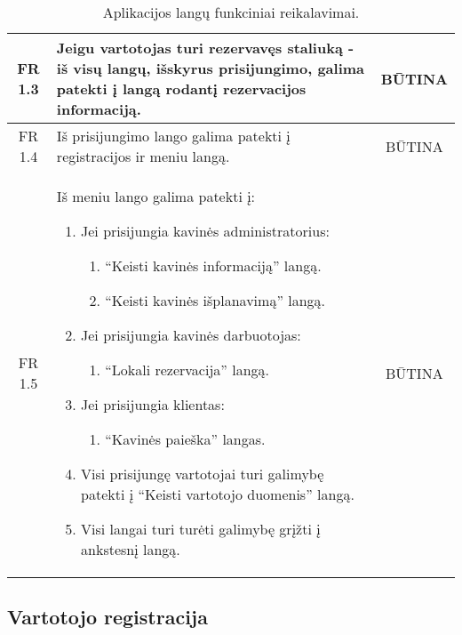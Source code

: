 \documentclass{VUMIFPSkursinis}
\begin{document}
\begin{center}
\begin{table}[H]
\begin{tabular}{|p{2cm}|p{}|p{}|}
		\multicolumn{1}{|c|}{FR 1.3}&
		{Jeigu vartotojas turi rezervavęs staliuką - iš visų langų, išskyrus \newline prisijungimo, galima patekti į langą rodantį rezervacijos informaciją.}&
		\multicolumn{1}{|c|}{BŪTINA}\\
	\hline
		\multicolumn{1}{|c|}{FR 1.4}&
		{Iš prisijungimo lango galima patekti į registracijos ir meniu langą.}&
		\multicolumn{1}{|c|}{BŪTINA}\\
	\hline
		\multicolumn{1}{|c|}{FR 1.5}&
		{Iš meniu lango galima patekti į:\newline
		\begin{enumerate}
			\item Jei prisijungia kavinės administratorius:
				\begin{enumerate}
					\item “Keisti kavinės informaciją” langą.
					\item “Keisti kavinės išplanavimą” langą.
				\end{enumerate}
			\item Jei prisijungia kavinės darbuotojas:
				\begin{enumerate}
					\item “Lokali rezervacija” langą.
				\end{enumerate}
			\item Jei prisijungia klientas:
				\begin{enumerate}
					\item “Kavinės paieška” langas.
				\end{enumerate}
			\item Visi prisijungę vartotojai turi galimybę patekti į “Keisti vartotojo duomenis” langą.
			\item Visi langai turi turėti galimybę grįžti į ankstesnį langą.
		\end{enumerate}
		}&
		\multicolumn{1}{|c|}{BŪTINA}\\		
	\hline
	
	\end{tabular}
	\caption{Aplikacijos langų funkciniai reikalavimai.}
	\label{table:AplikacijosLangai}
	\end{table}
	
\end{center}

\pagebreak

\subsection{Vartotojo registracija}
\end{document}
